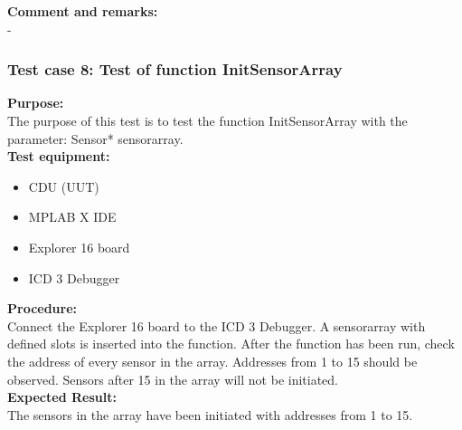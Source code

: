 \textbf{Comment and remarks:}\\
-\\

\subsubsection{Test case 8: Test of function InitSensorArray }
\textbf{Purpose:}\\
The purpose of this test is to test the function InitSensorArray with the parameter: Sensor* sensorarray.\\

\textbf{Test equipment:}
\begin{itemize}
\item CDU (UUT)
\item MPLAB X IDE
\item Explorer 16 board
\item ICD 3 Debugger
\end{itemize}

\textbf{Procedure:}\\
Connect the Explorer 16 board to the ICD 3 Debugger. A sensorarray with defined slots is inserted into the function. After the function has been run, check the address of every sensor in the array. Addresses from 1 to 15 should be observed. Sensors after 15 in the array will not be initiated.\\

\textbf{Expected Result:}\\
The sensors in the array have been initiated with addresses from 1 to 15.\\

